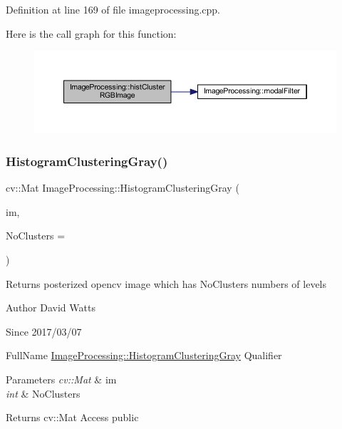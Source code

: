 Definition at line 169 of file imageprocessing.\+cpp.

Here is the call graph for this function\+:
\nopagebreak
\begin{figure}[H]
\begin{center}
\leavevmode
\includegraphics[width=350pt]{class_image_processing_ad95299703a3db5104a65c162dd07d5f9_cgraph}
\end{center}
\end{figure}
\mbox{\label{class_image_processing_a4f0e35a8e54832a3d447c6fbeba5f11a}} 
\subsubsection{\texorpdfstring{Histogram\+Clustering\+Gray()}{HistogramClusteringGray()}}
{\footnotesize\ttfamily cv\+::\+Mat Image\+Processing\+::\+Histogram\+Clustering\+Gray (\begin{DoxyParamCaption}\item[{cv\+::\+Mat}]{im,  }\item[{int}]{No\+Clusters = {} }\end{DoxyParamCaption})\hspace{0.3cm}{\ttfamily [static]}}

Returns posterized opencv image which has No\+Clusters numbers of levels

\begin{DoxyAuthor}{Author}
David Watts 
\end{DoxyAuthor}
\begin{DoxySince}{Since}
2017/03/07
\end{DoxySince}
Full\+Name \hyperlink{class_image_processing_a4f0e35a8e54832a3d447c6fbeba5f11a}{Image\+Processing\+::\+Histogram\+Clustering\+Gray} Qualifier 
\begin{DoxyParams}{Parameters}
{\em cv\+::\+Mat} & im \\
\hline
{\em int} & No\+Clusters \\
\hline
\end{DoxyParams}
\begin{DoxyReturn}{Returns}
cv\+::\+Mat Access public 
\end{DoxyReturn}


